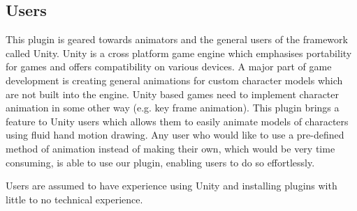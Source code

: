 \subsection{Users}
This plugin is geared towards animators and the general users of the framework called Unity. Unity is a cross platform game engine which emphasises portability for games and offers compatibility on various devices. A major part of game development is creating general animations for custom character models which are not built into the engine. Unity based games need to implement character animation in some other way (e.g. key frame animation). This plugin brings a feature to Unity users which allows them to easily animate models of characters using fluid hand motion drawing. Any user who would like to use a pre-defined method of animation instead of making their own, which would be very time consuming, is able to use our plugin, enabling users to do so effortlessly.

Users are assumed to have experience using Unity and installing plugins with little to no technical experience.
